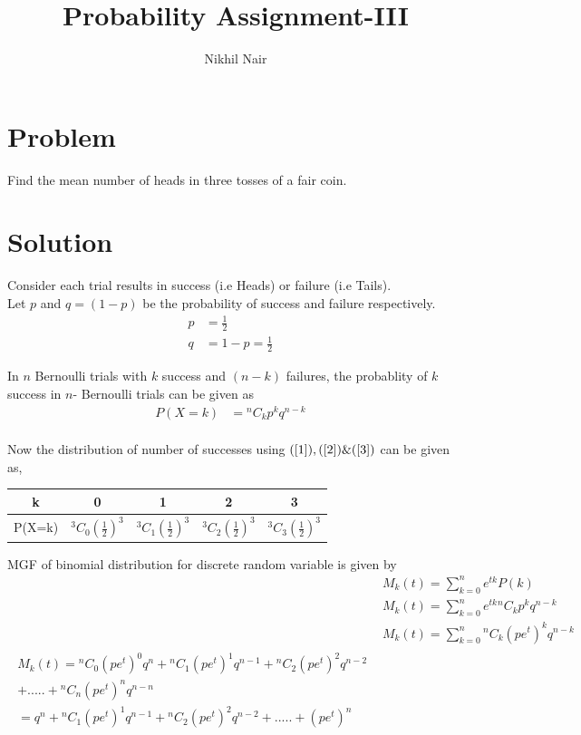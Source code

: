 \documentclass[journal,12pt,twocolumn]{IEEEtran}
\title{\mytitle}
\title{
Probability Assignment-III
}
\author{Nikhil Nair}
\begin{document}
\maketitle
\bigskip


\section{\textbf{Problem }}
Find the mean number of heads in three tosses of a fair coin.


\section{\textbf{Solution }}
Consider each trial results in success (i.e Heads) or failure (i.e Tails).
\\
 
Let $p$ and $q = (1 - p)$ be the probability of success and failure respectively.
\begin{align}
p &= \frac{1}{2}&               \label{1}
\\            
q &= 1 - p = \frac{1}{2}&       \label{2}
\end{align}

In $n$ Bernoulli trials with $k$ success and $(n - k)$ failures, the probablity of $k$ success in $n$- Bernoulli trials can be given as\\
\begin{align}
P(X =k) &= {}^nC_kp^{k} q^{n-k}&             \label{3}
\end{align}
\\

Now the distribution of number of successes using $(\ref{1}),(\ref{2}) \& (\ref{3})$ can be given as,
\begin{center}
\begin{tabular}{ |c |c |c |c |c |}
 \hline
 k  &  0 &  1  &  2 & 3\\
 \hline
 P(X=k)  &  $^3C_0(\frac{1}{2})^{3}$  & $^3C_1(\frac{1}{2})^{3}$  &  $^3C_2(\frac{1}{2})^{3}$ & $^3C_3(\frac{1}{2})^{3}$\\
 \hline
\end{tabular}
\end{center}

MGF of binomial distribution for discrete random variable is given by
\\
\begin{align}
&M_k(t) = \sum_{k=0}^{n} e^{tk} P(k)&
\\
&M_k(t) = \sum_{k=0}^{n} e^{tk} {}^nC_kp^{k} q^{n-k}&
\\
&M_k(t) = \sum_{k=0}^{n} {}^nC_k (pe^t)^{k} q^{n-k}&
\\
\begin{split}
M_k(t) = {}^nC_0 (pe^t)^{0} q^{n} + {}^nC_1 (pe^t)^{1} q^{n-1} + {}^nC_2 (pe^t)^{2} q^{n-2} \\+.....+ {}^nC_n (pe^t)^{n} q^{n-n}
\\
=  q^{n} + {}^nC_1 (pe^t)^{1} q^{n-1} + {}^nC_2 (pe^t)^{2} q^{n-2}+.....+ (pe^t)^{n}                   \label{7}
\end{split}
\end{align}
\\
\end{document}
